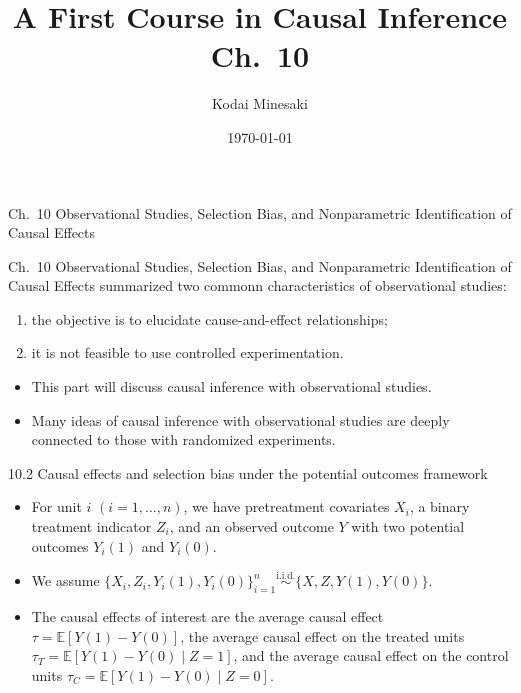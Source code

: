 \documentclass[aspectratio=169, 12pt]{beamer}
\title[]{A First Course in Causal Inference Ch.~10}
\author[Kodai Minesaki]{Kodai Minesaki}
\institute[Faculty of Engineering, The University of Tokyo]{Faculty of Engineering, The University of Tokyo}
\date{\today}
\begin{document}
\begin{frame}
\titlepage
\end{frame}


\begin{frame}

  {
    \large
    Ch.~10 Observational Studies, Selection Bias, and Nonparametric Identification of Causal Effects
  }
  
\end{frame}

\begin{frame}{Ch.~10 Observational Studies, Selection Bias, and Nonparametric Identification of Causal Effects}
  \citet{cochran1965planning} summarized two commonn characteristics of observational studies:
  \begin{enumerate}
    \item the objective is to elucidate cause-and-effect relationships;
    \item it is not feasible to use controlled experimentation.
  \end{enumerate}
  \begin{itemize}
    \item This part will discuss causal inference with observational studies.
    \item Many ideas of causal inference with observational studies are deeply connected to those with randomized experiments.
  \end{itemize}
\end{frame}

\begin{frame}{10.2 Causal effects and selection bias under the potential outcomes framework}
  \begin{itemize}
    \item For unit $i$ $(i=1,\dots,n)$, we have pretreatment covariates $X_i$, a binary treatment indicator $Z_i$, and an observed outcome $Y$ with two potential outcomes $Y_i(1)$ and $Y_i(0)$.
    \item We assume $\{X_i,Z_i,Y_i(1),Y_i(0)\}_{i=1}^n\overset{\text{i.i.d.}}{\sim}\{X,Z,Y(1),Y(0)\}.$
    \item The causal effects of interest are the average causal effect $\tau=\mathbb{E}[Y(1)-Y(0)]$, the average causal effect on the treated units $\tau_T=\mathbb{E}[Y(1)-Y(0)\mid Z=1]$, and the average causal effect on the control units $\tau_C=\mathbb{E}[Y(1)-Y(0)\mid Z=0].$
  \end{itemize}
\end{frame}
\end{document}
